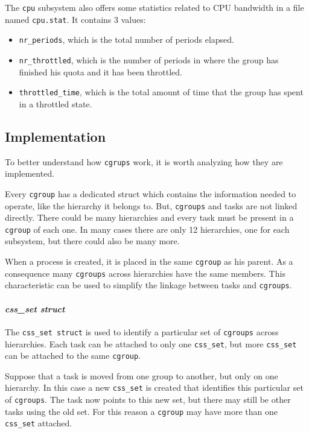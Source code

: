 The \verb|cpu| subsystem also offers some statistics related to CPU bandwidth in a file named \verb|cpu.stat|. It contains 3 values:
\begin{itemize}
    \item \verb|nr_periods|, which is the total number of periods elapsed.
    \item \verb|nr_throttled|, which is the number of periods in where the group has finished his quota and it has been throttled.
    \item \verb|throttled_time|, which is the total amount of time that the group has spent in a throttled state.
\end{itemize}

\subsection{Implementation}

To better understand how \verb|cgrups| work, it is worth analyzing how they are implemented.

Every \verb|cgroup| has a dedicated struct which contains the information needed to operate, like the hierarchy it belongs to. But, \verb|cgroups| and tasks are not linked directly. There could be many hierarchies and every task must be present in a \verb|cgroup| of each one. In many cases there are only 12 hierarchies, one for each subsystem, but there could also be many more. 

When a process is created, it is placed in the same \verb|cgroup| as his parent. As a consequence many \verb|cgroups| across hierarchies have the same members. This characteristic can be used to simplify the linkage between tasks and \verb|cgroups|.

\paragraph{\textit{css\_set struct}}
The \verb|css_set struct| is used to identify a particular set of \verb|cgroups| across hierarchies. Each task can be attached to only one \verb|css_set|, but more \verb|css_set| can be attached to the same \verb|cgroup|. 

Suppose that a task is moved from one group to another, but only on one hierarchy. In this case a new \verb|css_set| is created that identifies this particular set of \verb|cgroups|. The task now points to this new set, but there may still be other tasks using the old set. For this reason a \verb|cgroup| may have more than one \verb|css_set| attached.

